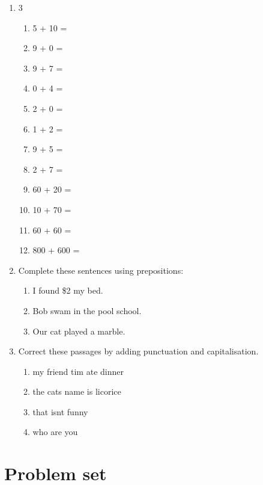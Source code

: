 \documentclass{tufte-book}
\begin{document}
\begin{enumerate}
  \item
  \begin{multicols}{3}
    \begin{enumerate}\bigskip
      \item 5 + 10 = \dotfill\bigskip
      \item 9 + 0 = \dotfill\bigskip
      \item 9 + 7 = \dotfill\bigskip
      \item 0 + 4 = \dotfill
      \item 2 + 0 = \dotfill\bigskip
      \item 1 + 2 = \dotfill\bigskip
      \item 9 + 5 = \dotfill\bigskip
      \item 2 + 7 = \dotfill
      \item 60 + 20 = \dotfill\bigskip
      \item 10 + 70 = \dotfill\bigskip
      \item 60 + 60 = \dotfill\bigskip
      \item 800 + 600 = \dotfill
    \end{enumerate}
  \end{multicols}

  \item
  Complete these sentences using prepositions:
  \begin{enumerate}\bigskip
    \item I found \$2 \makebox[3cm][s]{\dotfill} my bed.\bigskip
    \item Bob swam in the pool \makebox[3cm][s]{\dotfill} school.\bigskip
    \item Our cat played \makebox[3cm][s]{\dotfill} a marble.\bigskip
  \end{enumerate}

  \item Correct these passages by adding punctuation and capitalisation.
  \begin{enumerate}\bigskip
    \item my friend tim ate dinner\bigskip
    \item the cats name is licorice\bigskip
    \item that isnt funny\bigskip
    \item who are you
  \end{enumerate}

\end{enumerate}

\clearpage\section{Problem set }
\end{document}

